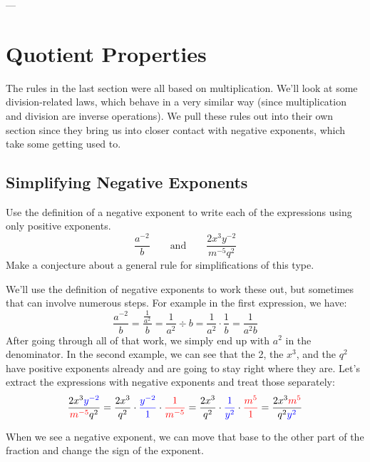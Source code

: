 \begin{boxedex}
---
\end{boxedex}


\section{Quotient Properties} 
\label{sec:expoquotient}

The rules in the last section were all based on multiplication. We'll look at some division-related laws, which behave in a very similar way (since multiplication and division are inverse operations). We pull these rules out into their own section since they bring us into closer contact with negative exponents, which take some getting used to.

\subsection{Simplifying Negative Exponents}

\begin{boxedexplore}
Use the definition of a negative exponent to write each of the expressions using only positive exponents.
\[\frac{a^{-2}}{b} \qquad\text{and}\qquad \frac{2x^3y^{-2}}{m^{-5}q^2}\]
Make a conjecture about a general rule for simplifications of this type.
\end{boxedexplore}

We'll use the definition of negative exponents to work these out, but sometimes that can involve numerous steps. For example in the first expression, we have:
\[\frac{a^{-2}}{~b~} = \frac{\frac{1}{a^2}}{~b~} = \frac{1}{a^2}\div{b} = \frac{1}{a^2}\cdot\frac{1}{b} = \frac{1}{a^2b}\]
After going through all of that work, we simply end up with $a^2$ in the denominator. In the second example, we can see that the 2, the $x^3$, and the $q^2$ have positive exponents already and are going to stay right where they are. Let's extract the expressions with negative exponents and treat those separately:
\[\frac{2x^3{\color{blue}y^{-2}}}{{\color{red}m^{-5}}q^2}
= \frac{2x^3}{q^2}\cdot{\color{blue}\frac{y^{-2}}{1}}\cdot{\color{red}\frac{1}{m^{-5}}}
= \frac{2x^3}{q^2}\cdot{\color{blue}\frac{1}{y^2}}\cdot{\color{red}\frac{m^5}{1}}
= \frac{2x^3{\color{red}m^5}}{q^2{\color{blue}y^2}}\]

When we see a negative exponent, we can move that base to the other part of the fraction and change the sign of the exponent.

